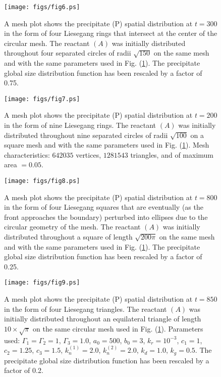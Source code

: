 \documentclass[aps,preprint]{revtex4}
\begin{document}
\begin{figure}[htb]
\begin{center}
\texttt{[image: figs/fig6.ps]}
\end{center}
\caption{A mesh plot shows the precipitate (P) spatial distribution at $t
=300$ in the form of four Liesegang rings that intersect at the center of the
circular mesh. The reactant $(A)$ was initially distributed throughout four
separated circles of radii $\sqrt{150}$ on the same mesh and with the same
parameters used in Fig. (\ref{fig:CV5}). The precipitate global size
distribution function has been rescaled by a factor of 0.75.}
\label{fig:CV5}
\end{figure}

\begin{figure}[htb]
\begin{center}
\texttt{[image: figs/fig7.ps]}
\end{center}
\caption{A mesh plot shows the precipitate (P) spatial distribution at $t
=200$ in the form of nine Liesegang rings. The reactant $(A)$ was initially
distributed throughout nine separated circles of radii $\sqrt{100}$ on a
square mesh and with the same parameters used in Fig. (\ref{fig:CV5}). Mesh
characteristics: $642035$ vertices, $1281543$ triangles, and of maximum area
$= 0.05$.}
\label{fig:CV6}
\end{figure}

\begin{figure}[htb]
\begin{center}
\texttt{[image: figs/fig8.ps]}
\end{center}
\caption{A mesh plot shows the precipitate (P) spatial distribution at $t=800$
in the form of four Liesegang squares that are eventually (as the front
approaches the boundary) perturbed into ellipses due to the circular geometry
of the mesh. The reactant $(A)$ was initially distributed throughout a square
of length $\sqrt{200\pi}$ on the same mesh and with the same parameters used
in Fig. (\ref{fig:CV5}). The precipitate global size distribution function has
been rescaled by a factor of 0.25.}
\label{fig:CV7}
\end{figure}

\begin{figure}[htb]
\begin{center}
\texttt{[image: figs/fig9.ps]}
\end{center}
\caption{A mesh plot shows the precipitate (P) spatial distribution at $t=850$
in the form of four Liesegang triangles. The reactant $(A)$ was initially
distributed throughout an equilateral triangle of length $10\times\sqrt{\pi}$
on the same circular mesh used in Fig. (\ref{fig:CV5}). Parameters used:
${\Gamma}_{1}={\Gamma}_{2}=1$, ${\Gamma}_{3}=1.0$, $a_{0}=500$, $b_{0}=3$,
$k_{r}=10^{-3}$, $c_{1}=1$, $c_{2}=1.25$, $c_{3}=1.5$, $k_{n}^{(1)}=2.0$,
$k_{n}^{(2)}=2.0$, $k_{d}=1.0$, $k_{g}=0.5$. The precipitate global size
distribution function has been rescaled by a factor of 0.2.}
\label{fig:CV8}
\end{figure}
\end{document}
